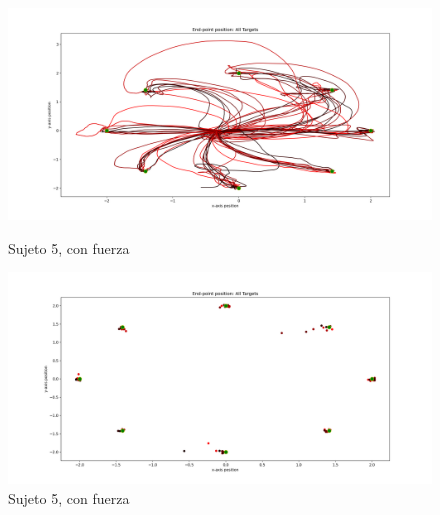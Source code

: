 \documentclass[a4paper,11pt, oneside]{book}
\begin{document}
\begin{figure}[H]
	\begin{minipage}[b]{0.5\linewidth}
		\centering
		\includegraphics[width=\linewidth]{sujeto5/force/trayectorias}
		\caption{Sujeto 5, con fuerza}
		\label{5-fase2-1}
	\end{minipage}
	\hspace{0.5cm}
	\begin{minipage}[b]{0.5\linewidth}
		\centering
		\includegraphics[width=\linewidth]{sujeto5/force/trayectorias_puntos}
		\caption{Sujeto 5, con fuerza}
		\label{5-fase2-2}
	\end{minipage}
\end{figure}
\end{document}
